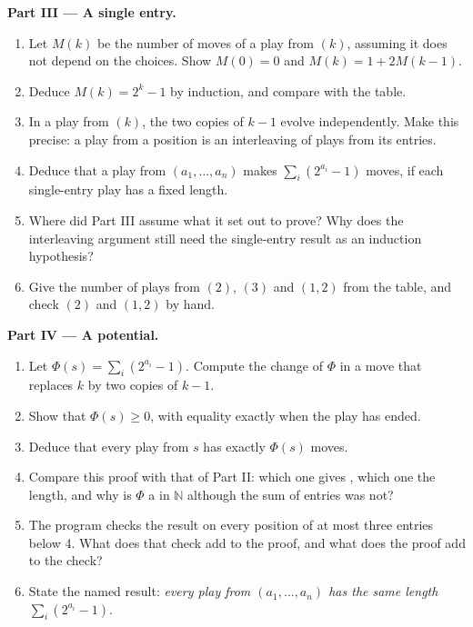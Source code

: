 \begin{problem}
\medskip\noindent\textbf{Part III --- A single entry.}
\begin{enumerate}[resume]
\item Let $M(k)$ be the number of moves of a play from $(k)$, assuming it does not depend on the choices. Show
$M(0) = 0$ and $M(k) = 1 + 2M(k - 1)$.
\item Deduce $M(k) = 2^k - 1$ by induction, and compare with the table.
\item In a play from $(k)$, the two copies of $k - 1$ evolve independently. Make this precise: a play from a position
is an interleaving of plays from its entries.
\item Deduce that a play from $(a_1, \dots, a_n)$ makes $\sum_i (2^{a_i} - 1)$ moves, if each single-entry play has a
fixed length.
\item Where did Part III assume what it set out to prove? Why does the interleaving argument still need the
single-entry result as an induction hypothesis?
\item Give the number of plays from $(2)$, $(3)$ and $(1, 2)$ from the table, and check $(2)$ and $(1, 2)$ by hand.
\end{enumerate}

\medskip\noindent\textbf{Part IV --- A potential.}
\begin{enumerate}[resume]
\item Let $\Phi(s) = \sum_i (2^{a_i} - 1)$. Compute the change of $\Phi$ in a move that replaces $k$ by two copies of $k -
1$.
\item Show that $\Phi(s) \geq 0$, with equality exactly when the play has ended.
\item Deduce that every play from $s$ has exactly $\Phi(s)$ moves.
\item Compare this proof with that of Part II: which one gives , which one the length, and why is
$\Phi$ a  in $\mathbb{N}$ although the sum of entries was not?
\item The program checks the result on every position of at most three entries below 4. What does that check add to
the proof, and what does the proof add to the check?
\item State the named result: \emph{every play from $(a_1, \dots, a_n)$ has the same length $\sum_i (2^{a_i} - 1)$}.
\end{enumerate}
\end{problem}
